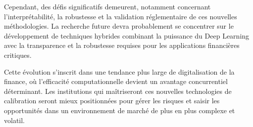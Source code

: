 Cependant, des défis significatifs demeurent, notamment concernant l'interprétabilité, la robustesse et la validation réglementaire de ces nouvelles méthodologies. La recherche future devra probablement se concentrer sur le développement de techniques hybrides combinant la puissance du Deep Learning avec la transparence et la robustesse requises pour les applications financières critiques.

Cette évolution s'inscrit dans une tendance plus large de digitalisation de la finance, où l'efficacité computationnelle devient un avantage concurrentiel déterminant. Les institutions qui maîtriseront ces nouvelles technologies de calibration seront mieux positionnées pour gérer les risques et saisir les opportunités dans un environnement de marché de plus en plus complexe et volatil.
